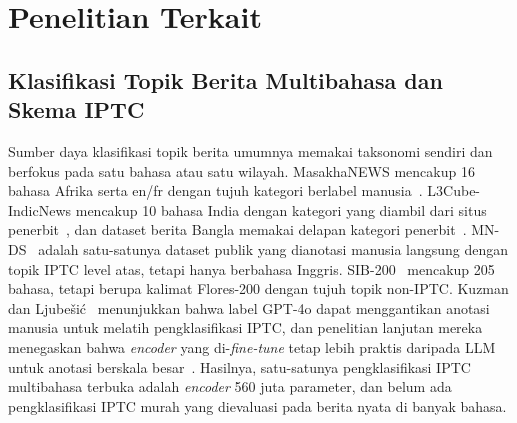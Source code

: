 \documentclass[journal]{IEEEtran}
\newcommand{\eng}[1]{\textit{#1}}   %
\begin{document}
\section{Penelitian Terkait}
\label{sec:related}

\subsection{Klasifikasi Topik Berita Multibahasa dan Skema IPTC}
Sumber daya klasifikasi topik berita umumnya memakai taksonomi sendiri dan berfokus pada satu bahasa atau satu wilayah. MasakhaNEWS mencakup 16 bahasa Afrika serta en/fr dengan tujuh kategori berlabel manusia~\cite{adelani2023masakhanews}. L3Cube-IndicNews mencakup 10 bahasa India dengan kategori yang diambil dari situs penerbit~\cite{mirashi2023indicnews}, dan dataset berita Bangla memakai delapan kategori penerbit~\cite{hossain2025banglanews}. MN-DS~\cite{petukhova2023mnds} adalah satu-satunya dataset publik yang dianotasi manusia langsung dengan topik IPTC level atas, tetapi hanya berbahasa Inggris. SIB-200~\cite{adelani2024sib200} mencakup 205 bahasa, tetapi berupa kalimat Flores-200 dengan tujuh topik non-IPTC. Kuzman dan Ljube\v{s}i\'c~\cite{kuzman2025llm} menunjukkan bahwa label GPT-4o dapat menggantikan anotasi manusia untuk melatih pengklasifikasi IPTC, dan penelitian lanjutan mereka menegaskan bahwa \eng{encoder} yang di-\eng{fine-tune} tetap lebih praktis daripada LLM untuk anotasi berskala besar~\cite{kuzman2025southslavic}. Hasilnya, satu-satunya pengklasifikasi IPTC multibahasa terbuka adalah \eng{encoder} 560 juta parameter, dan belum ada pengklasifikasi IPTC murah yang dievaluasi pada berita nyata di banyak bahasa.
\end{document}
